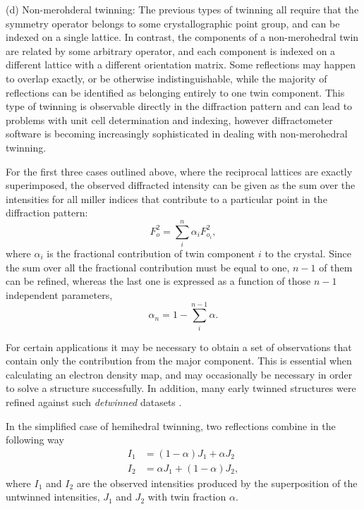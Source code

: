 \documentclass[pdf]{iucr}
\begin{document}
(d) Non-merohderal twinning: The previous types of twinning all require that the symmetry operator belongs to some crystallographic point group, and can be indexed on a single lattice. In contrast, the components of a non-merohedral twin are related by some arbitrary operator, and each component is indexed on a different lattice with a different orientation matrix. Some reflections may happen to overlap exactly, or be otherwise indistinguishable, while the majority of reflections can be identified as belonging entirely to one twin component. This type of twinning is observable directly in the diffraction pattern and can lead to problems with unit cell determination and indexing, however diffractometer software is becoming increasingly sophisticated in dealing with non-merohedral twinning.

For the first three cases outlined above, where the reciprocal lattices are exactly superimposed, the observed diffracted intensity can be given as the sum over the intensities for all miller indices that contribute to a particular point in the diffraction pattern:
\begin{equation}
F_o^2 = \sum_i^{n}{\alpha_i F_{o_i}^2}
\label{eqn:twin_eq},
\end{equation}
where $\alpha_i$ is the fractional contribution of twin component $i$ to the crystal. Since the sum over all the fractional contribution must be equal to one, $n-1$ of them can be refined, whereas the last one is expressed as a function of those $n-1$ independent parameters,
\begin{equation}
\alpha_n = 1 - \sum_i^{n-1}{\alpha}
\label{eqn:twin_fractions}.
\end{equation}

For certain applications it may be necessary to obtain a set of observations that contain only the contribution from the major component. This is essential when calculating an electron density map, and may occasionally be necessary in order to solve a structure successfully. In addition, many early twinned structures were refined against such \emph{detwinned} datasets \cite{Grainger:a06498,Murray-Rust:a10328,Britton:a08682}.

In the simplified case of hemihedral twinning, two reflections combine in the following way 
\begin{align}
I_1 &= (1 - \alpha) J_1 + \alpha J_2 \\
I_2 &= \alpha J_1 + (1- \alpha) J_2
\label{eqn:twin_frac}
,
\end{align}
where $I_1$ and $I_2$ are the observed intensities produced by the superposition of the untwinned intensities, $J_1$ and $J_2$ with twin fraction $\alpha$.
\end{document}
